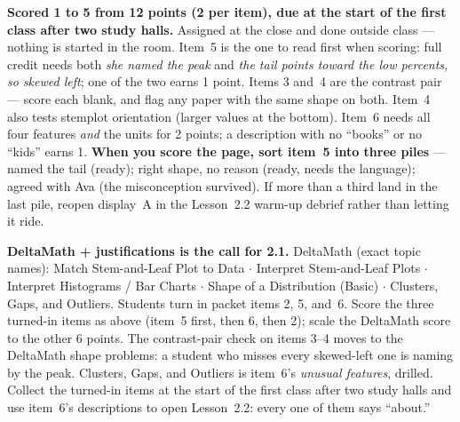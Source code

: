 \documentclass[10pt]{article}
\begin{document}
\begin{teachernote}[Homework]
\textbf{Scored 1 to 5 from 12 points (2 per item), due at the start of the first class after two study
halls.} Assigned at the close and done outside class --- nothing is started in the room. Item~5
is the one to read first when scoring: full credit needs both \emph{she named the peak} and
\emph{the tail points toward the low percents, so skewed left}; one of the two earns 1 point.
Items 3 and~4 are the contrast pair --- score each blank, and flag any paper with the same shape
on both. Item~4 also tests stemplot orientation (larger values at the bottom). Item~6 needs all
four features \emph{and} the units for 2 points; a description with no ``books'' or no ``kids''
earns 1. \textbf{When you score the page, sort item~5 into three piles} --- named the tail
(ready); right shape, no reason (ready, needs the language); agreed with Ava (the misconception
survived). If more than a third land in the last pile, reopen display~A in the Lesson~2.2
warm-up debrief rather than letting it ride.

\textbf{DeltaMath + justifications is the call for 2.1.} DeltaMath (exact topic names): Match
Stem-and-Leaf Plot to Data $\cdot$ Interpret Stem-and-Leaf Plots $\cdot$ Interpret Histograms /
Bar Charts $\cdot$ Shape of a Distribution (Basic) $\cdot$ Clusters, Gaps, and Outliers. Students turn
in packet items 2, 5, and~6. Score the three turned-in items as above (item~5 first, then 6, then
2); scale the DeltaMath score to the other 6 points. The contrast-pair check on items 3--4 moves
to the DeltaMath shape problems: a student who misses every skewed-left one is naming by the peak.
Clusters, Gaps, and Outliers is item~6's \emph{unusual features}, drilled.
Collect the turned-in items at the start of the first class after two study halls and use item~6's
descriptions to open Lesson~2.2: every one of them says ``about.''
\end{teachernote}
\end{document}
